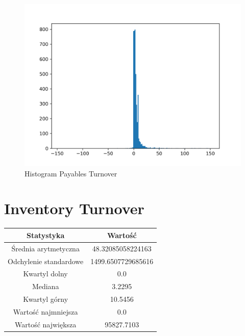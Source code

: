 \documentclass{article}
\begin{document}
\begin{figure}[h!]
    \includegraphics[width=\linewidth]{variables/Payables Turnover.png}
    \caption{Histogram Payables Turnover }
\end{figure}\section{ Inventory Turnover }

\begin{center}
    \begin{tabular}{|c | c|} 
    \hline
    Statystyka & Wartość \\
    \hline\hline
    Średnia arytmetyczna & 48.32085058224163 \\ 
    \hline
    Odchylenie standardowe & 1499.6507729685616 \\
    \hline
    Kwartyl dolny & 0.0 \\
    \hline
    Mediana & 3.2295 \\
    \hline
    Kwartyl górny & 10.5456 \\
    \hline
    Wartość najmniejsza & 0.0 \\
    \hline
    Wartość największa & 95827.7103 \\
    \hline
   \end{tabular}
\end{center}
\end{document}
